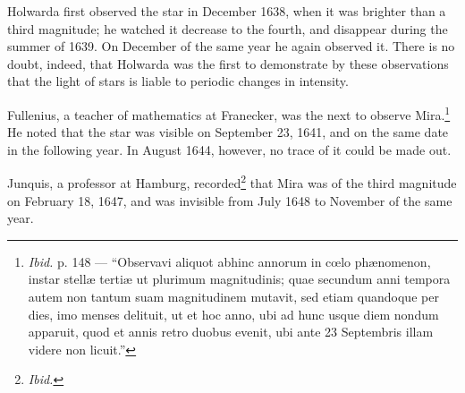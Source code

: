 \documentclass[a4paper, 12pt, oneside, polutonikogreek, english]{article}
\begin{document}
Holwarda first observed the star in December 1638, when it was brighter than a third magnitude; he watched it decrease to the fourth, and disappear during the summer of 1639. On December of the same year he again observed it. There is no doubt, indeed, that Holwarda was the first to demonstrate by these observations that the light of stars is liable to periodic changes in intensity.

Fullenius, a teacher of mathematics at Franecker, was the next to observe Mira.\footnote{\emph{Ibid.} p. 148 --- ``Observavi aliquot abhinc annorum in cœlo phænomenon, instar stellæ tertiæ ut plurimum magnitudinis; quae secundum anni tempora autem non tantum suam magnitudinem mutavit, sed etiam quandoque per dies, imo menses delituit, ut et hoc anno, ubi ad hunc usque diem nondum apparuit, quod et annis retro duobus evenit, ubi ante 23 Septembris illam videre non licuit.''} He noted that the star was visible on September 23, 1641, and on the same date in the following year. In August 1644, however, no trace of it could be made out.

Junquis, a professor at Hamburg, recorded\footnote{\emph{Ibid.}} that Mira was of the third magnitude on February 18, 1647, and was invisible from July 1648 to November of the same year.
\end{document}
